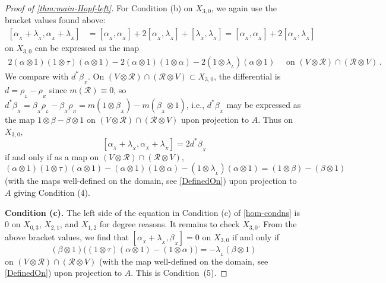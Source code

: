 \documentclass[11pt]{amsart}
\numberwithin{equation}{section}
\newtheorem{cor}[equation]{Corollary}
\newcommand{\X}{_X}
\newcommand{\alphax}{\alpha_{\X}}
\newcommand{\betax}{\beta_{\X}}
\newcommand{\lambdax}{\lambda_{\X}}
\newcommand{\chabl}{\cH_{\lambda,\alpha,\beta}}
\newcommand{\R}{\mathcal{R}}
\renewcommand{\_}[1]{\mbox{$_{\left( #1 \right)}$}}
\newcommand{\ot}{\otimes}
\newcommand{\Ho}{H}%
\newcommand{\cH}{\mathcal{H}}
\begin{document}
{\begin{proof}[Proof of \cref{thm:main-Hopf-left}]
For Condition (b) on $X_{3,0}$, we again use the bracket
values found above:
$$
\begin{aligned}
  [ \alphax + \lambdax , \alphax+\lambdax ]
  &=
  [ \alphax , \alphax ]
  + 2 [ \alphax , \lambdax ] + [ \lambdax , \lambdax ]
  =
  [ \alphax , \alphax ]
  + 2 [ \alphax , \lambdax ]
\end{aligned}
$$
on $X_{3,0}$ can be expressed as the map
  $$
\begin{aligned}
2 (\alpha\ot 1)(1\ot \tau)(\alpha\ot 1) 
-2(\alpha\ot 1)(1\ot \alpha)
-2(1\ot \lambda_{_L})(\alpha\ot 1)
\quad\text{ on }
(V\ot \R)\cap (\R\ot V) 
\, .
\end{aligned}
$$
%
We compare with $d^*\betax$.
On $(V\ot \R)\cap (\R\ot V) \subset X_{3,0}$,
the differential is
$d= \rho_{_L}-\rho_{_R}$
since $m(\R)\equiv 0$, 
so
$d^*\betax=\betax\rho_{_L}-\betax\rho_{_R} 
=m(1\ot\betax)-m(\betax \ot 1 )$,
i.e.,
$d^*\betax$
may be expressed as the map
$1\ot\beta-\beta \ot 1 
$ on $(V\ot \R)\cap (\R\ot V)$
upon projection to $A$.
Thus on $X_{3,0}$,  
  $$[ \alphax + \lambdax , \alphax+\lambdax ]= 2d^*\betax$$
if and only if as a map on $(V\ot \R)\cap (\R\ot V)$,
$$
 (\alpha\ot 1)(1\ot \tau)(\alpha\ot 1) 
-(\alpha\ot 1)(1\ot \alpha) 
-(1\ot \lambda_{_L})(\alpha\ot 1) 
=(1\ot\beta)-(\beta \ot 1 ) 
$$
(with the maps well-defined 
on the domain, see \cref{DefinedOn})
upon projection to $A$ 
giving Condition (4).




{\bf Condition (c).}
The left side of the equation in Condition (c) of \cref{hom-condns} 
is $0$ on $X_{0,3}$, $X_{2,1}$, and $X_{1,2}$ for degree reasons.
It remains to check  $X_{3,0}$.
From the above bracket values, we find that
$[\alphax+\lambdax,\betax]= 0$ on $X_{3,0}$
if and only
if $$(\beta\ot 1)\big((1\ot\tau)(\alpha\ot 1) - (1\ot \alpha)\big) = 
- \lambda_{_L} (\beta\ot 1) \, 
$$
on $(V\ot \R)\cap (\R\ot V)$
(with the map well-defined 
on the domain, see \cref{DefinedOn})
upon projection to $A$.
This is Condition~(5).
\end{proof}




}
\end{document}

